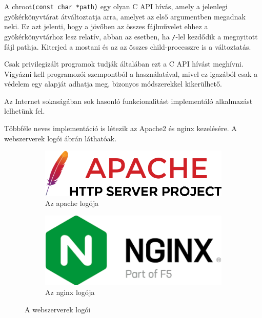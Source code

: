  \label{ref:chroot}
A chroot\texttt{(const char *path)} egy olyan C API hívás, amely a jelenlegi gyökérkönyvtárat átváltoztatja arra, amelyet az első argumentben megadnak neki. Ez azt jelenti, hogy a jövőben az összes fájlművelet ehhez a gyökérkönyvtárhoz lesz relatív, abban az esetben, ha \texttt{/}-lel kezdődik a megnyitott fájl pathja. Kiterjed a mostani és az az összes child-processzre is a változtatás. \cite{chroot}

Csak privilegizált programok tudják általában ezt a C API hívást meghívni. Vigyázni kell programozói szempontból a használatával, mivel ez igazából csak a védelem egy alapját adhatja meg, bizonyos módszerekkel kikerülhető.

\label{sect:similar_apps}
Az Internet sokaságában sok hasonló funkcionalitást implementáló alkalmazást lelhetünk fel.

Többféle neves implementáció is létezik az Apache2 és nginx kezelésére. A webszerverek logói  ábrán láthatóak.

\begin{figure}[h]
	\centering
	\begin{subfigure}{.5\textwidth}
		\centering
		\includegraphics[scale=0.35]{images/apache_httpd_logo.png}
		\caption{Az apache logója \cite{apache_logo}}
	\end{subfigure}%
	\begin{subfigure}{.5\textwidth}
		\centering
		\includegraphics[scale=0.35]{images/nginx_logo.png}
		\caption{Az nginx logója \cite{nginx_logo}}
	\end{subfigure}%
	\caption{A webszerverek logói}
	\label{fig:webservers_logo}
\end{figure}

